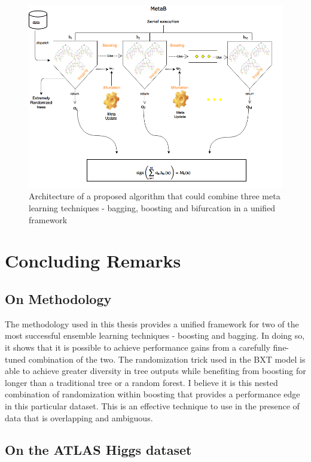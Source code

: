 \begin{figure}
\includegraphics[scale=0.75]{images/metab.png}
\caption{Architecture of a proposed algorithm that could combine three meta learning techniques - bagging, boosting and bifurcation in a unified framework}
\end{figure}

\section{Concluding Remarks}

\subsection{On Methodology}

The methodology used in this thesis provides a unified framework for two of the most successful ensemble learning techniques - boosting and bagging. In doing so, it shows that it is possible to achieve performance gains from a carefully fine-tuned combination of the two. The randomization trick used in the BXT model is able to achieve greater diversity in tree outputs while benefiting from boosting for longer than a traditional tree or a random forest. I believe it is this nested combination of randomization within boosting that provides a performance edge in this particular dataset. This is an effective technique to use in the presence of data that is overlapping and ambiguous.

\subsection{On the ATLAS Higgs dataset}

